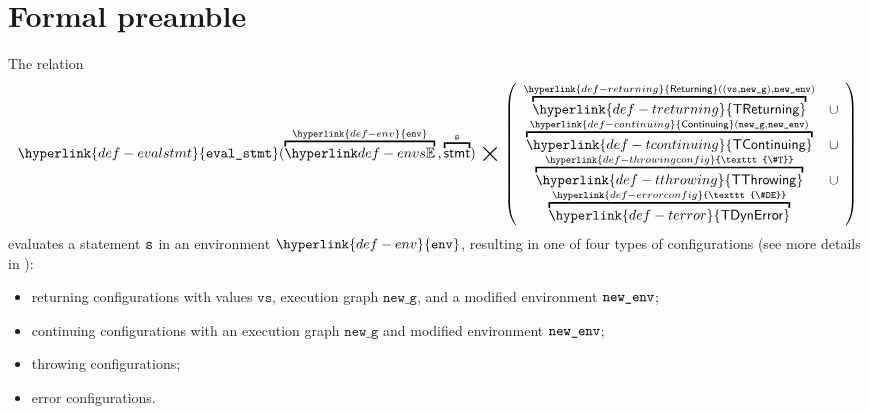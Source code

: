 \documentclass{book}
\newcommand\ThrowingConfig[0]{\hyperlink{def-throwingconfig}{\texttt{\#T}}}
\newcommand\ErrorConfig[0]{\hyperlink{def-errorconfig}{\texttt{\#DE}}}
\newcommand\TError[0]{\hyperlink{def-terror}{\textsf{TDynError}}}
\newcommand\TThrowing[0]{\hyperlink{def-tthrowing}{\textsf{TThrowing}}}
\newcommand\TContinuing[0]{\hyperlink{def-tcontinuing}{\textsf{TContinuing}}}
\newcommand\TReturning[0]{\hyperlink{def-treturning}{\textsf{TReturning}}}
\newcommand\evalstmt[1]{\hyperlink{def-evalstmt}{\texttt{eval\_stmt}}(#1)}
\newcommand\Continuing[0]{\hyperlink{def-continuing}{\textsf{Continuing}}}
\newcommand\Returning[0]{\hyperlink{def-returning}{\textsf{Returning}}}
\newcommand\env[0]{\hyperlink{def-env}{\texttt{env}}}
\newcommand\newg[0]{\texttt{new\_g}}
\newcommand\vvs[0]{\texttt{vs}}
\begin{document}
\section{Formal preamble}

The relation
\hypertarget{def-evalstmt}{}
\[
  \evalstmt{\overname{\envs}{\env} \aslsep \overname{\stmt}{\vs}} \;\aslrel\;
  \left(
  \begin{array}{cl}
  \overname{\TReturning}{\Returning((\vvs,\newg), \newenv)} & \cup\\
  \overname{\TContinuing}{\Continuing(\newg,\newenv)} & \cup\\
  \overname{\TThrowing}{\ThrowingConfig} & \cup \\
  \overname{\TError}{\ErrorConfig} &
  \end{array}
  \right)
\]
evaluates a statement $\texttt{s}$ in an environment $\env$, resulting in one of four types of configurations
(see more details in ):
\begin{itemize}
  \item returning configurations with values $\vvs$, execution graph $\newg$, and a modified environment $\texttt{new\_env}$;
  \item continuing configurations with an execution graph $\newg$ and modified environment $\texttt{new\_env}$;
  \item throwing configurations;
  \item error configurations.
\end{itemize}
\end{document}
